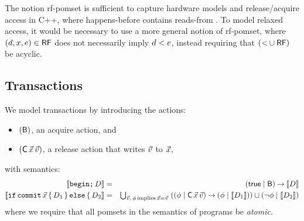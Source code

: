 
The notion rf-pomset is sufficient to capture hardware models and
release/acquire access in C++, where happens-before contains reads-from
\cite{Alglave:2014:HCM:2633904.2627752}.  To model relaxed access, it would
be necessary to use a more general notion of rf-pomset, where
$(d,x,e) \in \mathsf{RF}$ does not necessarily imply $d < e$, instead
requiring that $(\mathord< \cup \mathord{\mathsf{RF}})$ be acyclic.

\subsection{Transactions}
\label{sec:transactions}

We model transactions by introducing the actions:
\begin{itemize}
\item $(\mathsf{B})$, an acquire action, and
\item $(\DC{\vec\aLoc}{\vec\aVal})$, a release action that writes $\vec{v}$ to $\vec{x}$,
\end{itemize}
with semantics:
\begin{eqnarray*}
  \sem{\BEGIN\SEMI \bCmd}
  & = & %
  (\TRUE \mid \DB) \prefix \sem{\bCmd}
  \\
  \sem{\IF\COMMIT\vec\aLoc\THEN \bCmd_1 \ELSE \bCmd_2}
  & = & \textstyle\bigcup_{\vec\aVal,\,\aForm\,\text{implies}\,\vec\aLoc=\vec\aVal}\;
        ((\aForm \mid \DC{\vec\aLoc}{\vec\aVal}) \prefix (\aForm \mid \sem{\bCmd_1}))
        \sqcup  (\lnot\aForm \mid \sem{\bCmd_2})
\end{eqnarray*}
where we require that all pomsets in the semantics of programs be
\emph{atomic}.

